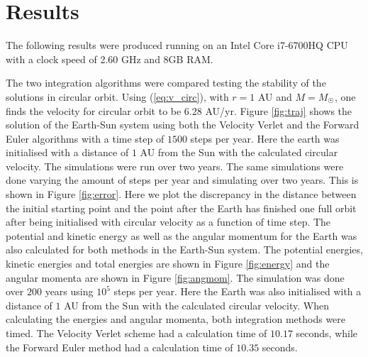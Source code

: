 \documentclass[twocolumn]{aastex62}
\begin{document}
\section{Results} \label{sec:results}
The following results were produced running on an Intel Core i7-6700HQ CPU with
a clock speed of 2.60 GHz and 8GB RAM.

The two integration algorithms were compared testing the stability of the
solutions in circular orbit. Using (\ref{eq:v_circ}), with
$r=1$ AU and $M=M_{\astrosun}$, one finds the velocity for circular
orbit to be $6.28$ AU/yr. Figure \ref{fig:traj} shows the solution of
the Earth-Sun system using both the Velocity Verlet and the Forward Euler
algorithms with a time step of $1500$ steps per year. Here the earth was
initialised with a distance of $1$ AU from the Sun with the calculated
circular velocity. The simulations were run over two years. The same simulations
were done varying the amount of steps per year and simulating over two years.
This is shown in Figure \ref{fig:error}. Here we plot the discrepancy in the
distance between the initial starting point and the point after the Earth has
finished one full orbit after being initialised with circular velocity as a
function of time step. The potential and kinetic energy as well as the angular
momentum for the Earth was also calculated for both methods in the Earth-Sun system. The
potential energies, kinetic energies and total energies are shown in Figure \ref{fig:energy} and the angular
momenta are shown in Figure \ref{fig:angmom}. The simulation was done over $200$
years using $10^5$ steps per year. Here the Earth was also initialised with a
distance of $1$ AU from the Sun with the calculated circular velocity.
When calculating the energies and angular momenta, both integration methods were
timed. The Velocity Verlet scheme had a calculation time of $10.17$ seconds, while the
Forward Euler method had a calculation time of $10.35$ seconds.
\end{document}
